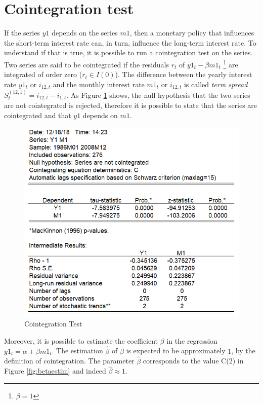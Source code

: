 \documentclass[12pt]{article}
\begin{document}
\section{Cointegration test} \label{sec:2}
If the series $y1$ depends on the series $m1$, then a monetary  policy that influences the short-term interest rate can, in turn, influence the long-term interest rate. To understand if that is true, it is possible to run a cointegration test on the series. Two series are said to be cointegrated if the residuals $r_t$ of $y1_t -\beta m1_t$ \footnote{$\beta = 1$} are integrated of order zero ($r_t \in I(0)$). The difference between the yearly interest rate $y1_t$ or $i_{12,t}$ and the monthly interest rate $m1_t$ or $i_{12,t}$ is called \textit{term spread} $S^{(12,1)}_t = i_{12,t} - i_{1,t}$.  As Figure \ref{fig:cointegrationtest} shows, the null hypothesis that the two series are not cointegrated is rejected, therefore it is possible to state that the series are cointegrated and that $y1$ depends on $m1$.
\begin{figure}[H]
\centering
\includegraphics[scale=1]{cointegration_test.PNG} 
\caption{Cointegration Test \label{fig:cointegrationtest} }
\end{figure}
\noindent Moreover, it is possible to estimate the coefficient $ \beta $ in the regression  $y1_t = \alpha + \beta m1_t$. The estimation $\hat{\beta}$ of $\beta$ is expected to be approximately $1$, by the definition of cointegration. The parameter $\hat{\beta}$ corresponds to the value C(2) in Figure \ref{fig:betaestim} and indeed $\hat{\beta} \approx 1$.
\end{document}

